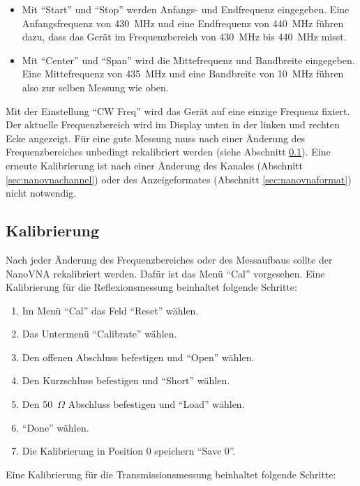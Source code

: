 \documentclass[twoside,a4paper,11pt,halfparskip,DIV=11,notitlepage]{scrartcl}
\newcommand{\Ohm}{$\Omega$\xspace}
\begin{document}
\begin{itemize}
    \item Mit ``Start'' und ``Stop'' werden Anfangs- und Endfrequenz eingegeben. Eine Anfangsfrequenz von
        430~MHz und eine Endfrequenz von 440~MHz führen dazu, dass das  Gerät im Frequenzbereich von 430~MHz bis 440~MHz misst.
    \item Mit ``Center'' und ``Span'' wird die Mittefrequenz und Bandbreite eingegeben. Eine Mittefrequenz von 435~MHz
        und eine Bandbreite von 10~MHz führen also zur selben Messung wie oben.
\end{itemize}

Mit der Einstellung ``CW Freq'' wird das Gerät auf eine einzige Frequenz fixiert.
Der aktuelle Frequenzbereich wird im Display unten in der linken und rechten
Ecke angezeigt. %
Für eine gute Messung muss nach einer Änderung des Frequenzbereiches unbedingt
rekalibriert werden (siehe Abschnitt \ref{sec:nanovnacal}). Eine erneute Kalibrierung
ist nach einer Änderung des Kanales (Abschnitt \ref{sec:nanovnachannel}) oder
des Anzeigeformates (Abschnitt \ref{sec:nanovnaformat}) nicht notwendig.

\subsection{Kalibrierung}\label{sec:nanovnacal}
Nach jeder Änderung des Frequenzbereiches oder des Messaufbaus sollte der
NanoVNA rekalibriert werden. Dafür ist das Menü ``Cal'' vorgesehen. Eine
Kalibrierung für die Reflexionsmessung beinhaltet folgende Schritte:

\begin{enumerate}
    \item Im Menü ``Cal'' das Feld ``Reset'' wählen.
    \item Das Untermenü ``Calibrate'' wählen.
    \item Den offenen Abschluss befestigen und ``Open'' wählen.
    \item Den Kurzschluss befestigen und ``Short'' wählen.
    \item Den 50~\Ohm Abschluss befestigen und ``Load'' wählen.
    \item ``Done'' wählen.
    \item Die Kalibrierung in Position 0 speichern ``Save 0''.
\end{enumerate}

Eine Kalibrierung für die Transmissionsmessung beinhaltet folgende Schritte:
\end{document}
